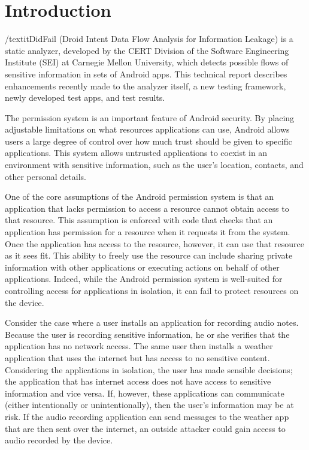 \makeatletter
\patchcmd{\chapter}{\if@openright\cleardoublepage\else\clearpage\fi}{\vspace{1in}}{}{}
\makeatother

\nonfrenchspacing

\chapter{Introduction}
\label{sec:intro}
/textit{DidFail} (Droid Intent Data Flow Analysis for Information Leakage) is
a static analyzer, developed by the CERT Division of the Software Engineering Institute (SEI) at Carnegie Mellon University, which detects possible flows of sensitive
information in sets of Android apps. 
This technical report describes enhancements recently made to the analyzer
itself, a new testing framework, newly developed test apps, and test results. 

The permission system is an important feature of Android security. By placing adjustable limitations on what resources applications can use, Android allows users a large degree of control over how much trust should be given to specific applications. This system allows untrusted applications to coexist in an environment with sensitive information, such as the user's location, contacts, and other personal details.

One of the core assumptions of the Android permission system is that an application that lacks permission to access a resource cannot obtain access to that resource. This assumption is enforced with code that checks that an application has permission for a resource when it requests it from the system. Once the application has access to the resource, however, it can use that resource as it sees fit. This ability to freely use the resource can include sharing private information with other applications or executing actions on behalf of other applications. Indeed, while the Android permission system is well-suited for controlling access for applications in isolation, it can fail to protect resources on the device.

Consider the case where a user installs an application for recording audio notes. Because the user is recording sensitive information, he or she verifies that the application has no network access. The same user then installs a weather application that uses the internet but has access to no sensitive content. Considering the applications in isolation, the user has made sensible decisions; the application that has internet access does not have access to sensitive information and vice versa. If, however, these applications can communicate (either intentionally or unintentionally), then the user's information may be at risk. If the audio recording application can send messages to the weather app that are then sent over the internet, an outside attacker could gain access to audio recorded by the device.


